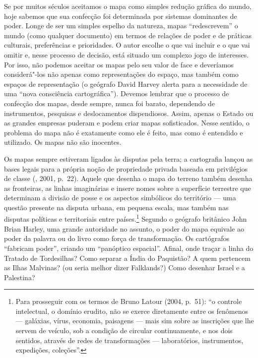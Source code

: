 Se por muitos séculos aceitamos o mapa como simples redução gráfica do
mundo, hoje sabemos que sua confecção foi determinada por sistemas
dominantes de poder. Longe de ser um simples espelho da natureza, mapas
``redescrevem'' o mundo (como qualquer documento) em termos de relações
de poder e de práticas culturais, preferências e prioridades. O autor
escolhe o que vai incluir e o que vai omitir e, nesse processo de
decisão, está situado um complexo jogo de interesses. Por isso, não
podemos aceitar os mapas pelo seu valor de face e deveríamos
considerá"-los não apenas como representações do espaço, mas também como
espaços de representação (o geógrafo David Harvey alerta para a
necessidade de uma ``nova consciência cartográfica''). Devemos lembrar
que o processo de confecção dos mapas, desde sempre, nunca foi barato,
dependendo de instrumentos, pesquisas e deslocamentos dispendiosos.
Assim, apenas o Estado ou as grandes empresas puderam e podem criar
mapas sofisticados. Nesse sentido, o problema do mapa não é exatamente
como ele é feito, mas como é entendido e utilizado. Os mapas não são
inocentes.

Os mapas sempre estiveram ligados às disputas pela terra; a cartografia
lançou as bases legais para a própria noção de propriedade privada
baseada em privilégios de classe (, 2001, p.~22). Aquele que
desenha o mapa do terreno também desenha as fronteiras, as linhas
imaginárias e insere nomes sobre a superfície terrestre que determinam a
divisão de posse e os aspectos simbólicos do território --- uma questão
presente na disputa urbana, em pequena escala, mas também nas disputas
políticas e territoriais entre países.\footnote{Para prosseguir com os
  termos de Bruno Latour (2004, p.~51): ``o controle intelectual, o
  domínio erudito, não se exerce diretamente entre os fenômenos ---
  galáxias, vírus, economia, paisagens --- mais sim sobre as inscrições
  que lhe servem de veículo, sob a condição de circular continuamente, e
  nos dois sentidos, através de redes de transformações --- laboratórios,
  instrumentos, expedições, coleções''.} Segundo o geógrafo britânico
John Brian Harley, uma grande autoridade no assunto, o poder do mapa
equivale ao poder da palavra ou do livro como força de transformação. Os
cartógrafos ``fabricam poder'', criando um ``panóptico espacial''.
Afinal, onde traçar a linha do Tratado de Tordesilhas? Como separar a
Índia do Paquistão? A quem pertencem as Ilhas Malvinas? (ou seria melhor
dizer Falklands?) Como desenhar Israel e a Palestina?

